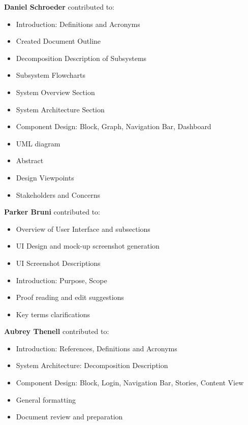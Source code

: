 \documentclass[journal,10pt,onecolumn,compsoc]{IEEEtran}
\begin{document}
       \noindent\textbf{Daniel Schroeder} contributed to: 
       \begin{itemize}
           \item Introduction: Definitions and Acronyms
           \item Created Document Outline 
           \item Decomposition Description of Subsystems
           \item Subsystem Flowcharts
           \item System Overview Section
           \item System Architecture Section
           \item Component Design: Block, Graph, Navigation Bar, Dashboard
           \item UML diagram
           \item Abstract
           \item Design Viewpoints
           \item Stakeholders and Concerns
       \end{itemize}
       \noindent\textbf{Parker Bruni} contributed to:
       \begin{itemize}
       	   \item Overview of User Interface and subsections
           \item UI Design and mock-up screenshot generation
           \item UI Screenshot Descriptions
           \item Introduction: Purpose, Scope
	   \item Proof reading and edit suggestions
	   \item Key terms clarifications
       \end{itemize}
       \noindent\textbf{Aubrey Thenell} contributed to:
       \begin{itemize} 
			\item Introduction: References, Definitions and Acronyms
			\item System Architecture: Decomposition Description
			\item Component Design: Block, Login, Navigation Bar, Stories, Content View
			\item General formatting
			\item Document review and preparation
       \end{itemize}
       
       \newpage
    \clearpage
    
\end{document}
